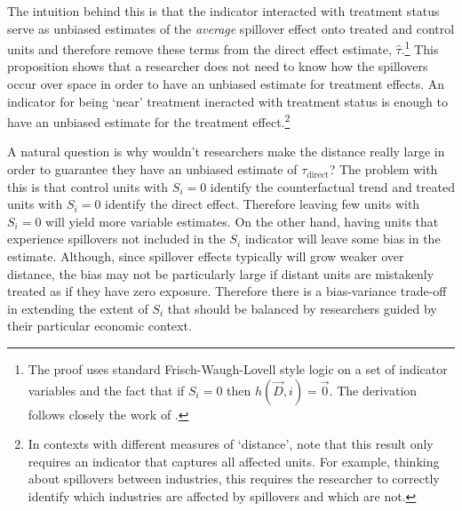 \documentclass[11pt]{article}
\begin{document}
The intuition behind this is that the indicator interacted with treatment status serve as unbiased estimates of the \textit{average} spillover effect onto treated and control units and therefore remove these terms from the direct effect estimate, $\hat{\tau}$.\footnote{The proof uses standard Frisch-Waugh-Lovell style logic on a set of indicator variables and the fact that if $S_{i} = 0$ then $h(\vec{D}, i) = \vec{0}$. The derivation follows closely the work of \citet{Clarke_2019}.} This proposition shows that a researcher does not need to know how the spillovers occur over space in order to have an unbiased estimate for treatment effects. An indicator for being `near' treatment ineracted with treatment status is enough to have an unbiased estimate for the treatment effect.\footnote{In contexts with different measures of `distance', note that this result only requires an indicator that captures all affected units. For example, thinking about spillovers between industries, this requires the researcher to correctly identify which industries are affected by spillovers and which are not.} 

A natural question is why wouldn't researchers make the distance really large in order to guarantee they have an unbiased estimate of $\tau_{\text{direct}}$? The problem with this is that control units with $S_i = 0$ identify the counterfactual trend and treated units with $S_i = 0$ identify the direct effect. Therefore leaving few units with $S_i = 0$ will yield more variable estimates. On the other hand, having units that experience spillovers not included in the $S_i$ indicator will leave some bias in the estimate. Although, since spillover effects typically will grow weaker over distance, the bias may not be particularly large if distant units are mistakenly treated as if they have zero exposure. Therefore there is a bias-variance trade-off in extending the extent of $S_i$ that should be balanced by researchers guided by their particular economic context.
\end{document}
